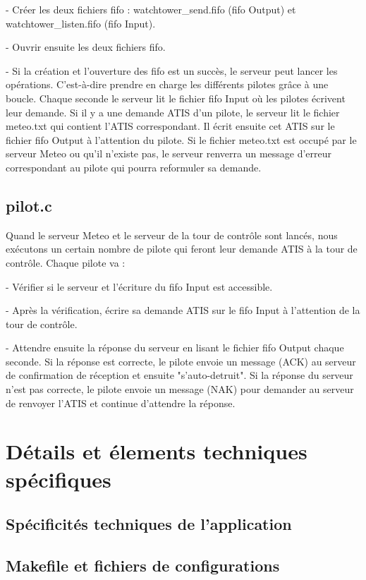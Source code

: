 \documentclass{report}
\begin{document}
{		- Créer les deux fichiers fifo : watchtower\_send.fifo (fifo Output) et watchtower\_listen.fifo (fifo Input).

		- Ouvrir ensuite les deux fichiers fifo.

		- Si la création et l'ouverture des fifo est un succès, le serveur peut lancer les opérations. C'est-à-dire prendre en charge les différents pilotes grâce à une boucle.
		Chaque seconde le serveur lit le fichier fifo Input où les pilotes écrivent leur demande. Si il y a une demande ATIS d'un pilote, le serveur lit le fichier meteo.txt qui contient l'ATIS correspondant. Il écrit ensuite cet ATIS sur le fichier fifo Output à l'attention du pilote. Si le fichier meteo.txt est occupé par le serveur Meteo ou qu'il n'existe pas, le serveur renverra un message d'erreur correspondant au pilote qui pourra reformuler sa demande.

	\section{pilot.c}
		
		Quand le serveur Meteo et le serveur de la tour de contrôle sont lancés, nous exécutons un certain nombre de pilote qui feront leur demande ATIS à la tour de contrôle.
		Chaque pilote va : 
		
		- Vérifier si le serveur et l'écriture du fifo Input est accessible.
		
		- Après la vérification, écrire sa demande ATIS sur le fifo Input à l'attention de la tour de contrôle.
		
		- Attendre ensuite la réponse du serveur en lisant le fichier fifo Output chaque seconde. Si la réponse est correcte, le pilote envoie un message (ACK) au serveur de confirmation de réception et ensuite "s'auto-detruit".  Si la réponse du serveur n'est pas correcte, le pilote envoie un message (NAK) pour demander au serveur de renvoyer l'ATIS et continue d'attendre la réponse.
		
\chapter{Détails et élements techniques spécifiques}

	\section{Spécificités techniques de l'application}

	\section{Makefile et fichiers de configurations}

}
\end{document}
